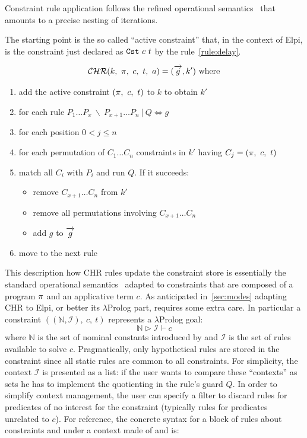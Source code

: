\documentclass[a4paper, 11pt]{book}
\begin{document}
Constraint rule application follows the refined operational
semantics~\cite{10.1007/978-3-540-27775-0_7} that amounts to a precise nesting of iterations.

The starting point is the so called ``active constraint'' that, in the context of Elpi, is
the constraint just declared as $\texttt{Cst}\ c\ t$ by the rule~\ref{rule:delay}.

$$
\mathcal{CHR}(k,\ \prog,\ c,\ t,\ \alts) = (\vecL{g}, k')\ \mathrm{where}
$$
\begin{enumerate}
\item add the active constraint $(\prog,\ c,\ t)$ to $k$ to obtain $k'$
\item for each rule $P_1 \ldots P_x\ \backslash\ P_{x+1} \ldots P_n\ |\ Q \Leftrightarrow g$
\item for each position $0 < j \leq n$
\item for each permutation of $C_1 \ldots C_n$ constraints in $k'$ having $C_j = ({\pi},\ c,\ t)$
\item match all $C_i$ with $P_i$ and run $Q$. If it succeeds:
  \begin{itemize}
    \item remove $C_{x+1} \ldots C_n$ from $k'$
    \item remove all permutations involving $C_{x+1} \ldots C_n$
    \item add $g$ to $\vecL{g}$
  \end{itemize}
\item move to the next rule
\end{enumerate}

This description how CHR rules update the constraint store is
essentially the standard operational semantics~\cite{10.1007/978-3-540-27775-0_7}
adapted to constraints that are composed of a program ${\pi}$ and
an applicative term $c$. As anticipated in~\cref{sec:modes} adapting CHR to Elpi, or
better its $\lambda$Prolog part, requires some extra care. In particular
a constraint $((\mathbb{N},\mathcal{I}),\ c,\ t)$ represents a $\lambda$Prolog goal:
$$
\mathbb{N} \triangleright  \mathcal{I} \vdash c
$$
\noindent
where $\mathbb{N}$ is the set of nominal constants introduced by 
and $\mathcal{I}$ is the set of rules available to solve $c$.
Pragmatically, only hypothetical rules are stored in the constraint since all
static rules are common to all constraints. 
For simplicity, the context $\mathcal{I}$ is presented as a list: if the
user wants to compare these ``contexts'' as sets he has to implement the
quotienting in the rule's guard $Q$. 
In order to simplify context management, the
user can specify a filter to discard rules for predicates of no interest for
the constraint (typically rules for predicates unrelated to $c$).
For reference, the concrete syntax for a block of rules about constraints
 and  under a context made of  and 
is:
\end{document}
